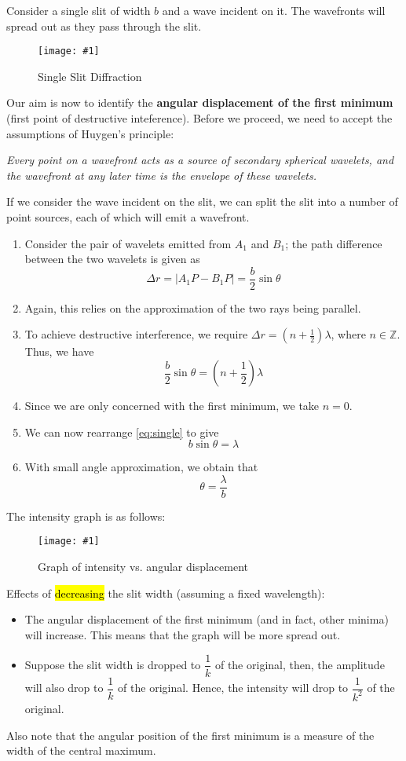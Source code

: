 \documentclass[a4paper,12pt]{article}
\newcommand{\lb}{\\[8pt]}
\newcommand{\img}[4]{\begin{center}
  \begin{figure}[H]
    \centering
    \texttt{[image: \#1]}
    \caption{#3}
    \label{fig:#4}
  \end{figure}
\end{center}}
\begin{document}
Consider a single slit of width $b$ and a wave incident on it. The wavefronts will spread out as they pass through the slit.
\img{singleslit.png}{0.5}{Single Slit Diffraction}{singleslit}
Our aim is now to identify the \textbf{angular displacement of the first minimum} (first point of destructive inteference). Before we proceed, we need to accept the assumptions of Huygen's principle:
\begin{center}
  \textit{Every point on a wavefront acts as a source of secondary spherical wavelets, and the wavefront at any later time is the envelope of these wavelets.}
\end{center}
If we consider the wave incident on the slit, we can split the slit into a number of point sources, each of which will emit a wavefront.
\pagebreak
\begin{enumerate}
  \item Consider the pair of wavelets emitted from $A_1$ and $B_1$; the path difference between the two wavelets is given as
        $$\Delta r = |A_1P - B_1P| = \frac{b}{2}\sin\theta$$
  \item Again, this relies on the approximation of the two rays being parallel.
  \item To achieve destructive interference, we require $\Delta r = (n + \frac{1}{2})\lambda$, where $n \in \mathbb{Z}$. Thus, we have
        \begin{equation}\label{eq:single}
          \frac{b}{2}\sin\theta = (n + \frac{1}{2})\lambda
        \end{equation}
  \item Since we are only concerned with the first minimum, we take $n = 0$.
  \item We can now rearrange \cref{eq:single} to give
        \begin{equation}\label{eq:single2}
          b\sin\theta = \lambda
        \end{equation}
  \item With small angle approximation, we obtain that
        \begin{equation}\label{eq:single_final}
          \theta = \frac{\lambda}{b}
        \end{equation}
\end{enumerate}

The intensity graph is as follows:
\img{singleslitintensity.png}{0.4}{Graph of intensity vs. angular displacement}{singleslitintensity}
Effects of \hl{decreasing} the slit width (assuming a fixed wavelength):
\begin{itemize}
  \item The angular displacement of the first minimum (and in fact, other minima) will increase. This means that the graph will be more spread out.
  \item Suppose the slit width is dropped to $\dfrac{1}{k}$ of the original, then, the amplitude will also drop to $\dfrac{1}{k}$ of the original. Hence, the intensity will drop to $\dfrac{1}{k^2}$ of the original.
\end{itemize}
Also note that the angular position of the first minimum is a measure of the width of the central maximum.\lb
\end{document}
